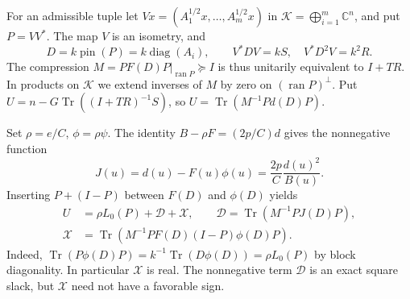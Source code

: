 \documentclass[11pt]{article}
\newcommand{\Tr}{\operatorname{Tr}}
\newcommand{\ran}{\operatorname{ran}}
\newcommand{\pin}{\operatorname{pin}}
\begin{document}
For an admissible tuple let
\(Vx=(A_1^{1/2}x,\ldots,A_m^{1/2}x)\) in
\(\mathcal K=\bigoplus_{i=1}^m\mathbb C^n\), and put \(P=VV^*\).
The map \(V\) is an isometry, and
\[
D=k\pin(P)=k\operatorname{diag}(A_i),\qquad
V^*DV=kS,\quad V^*D^2V=k^2R.
\]
The compression \(M=PF(D)P|_{\ran P}\succeq I\) is thus
unitarily equivalent to \(I+TR\). In products on \(\mathcal K\)
we extend inverses of \(M\) by zero on \((\ran P)^\perp\).
Put \(U=n-G\Tr((I+TR)^{-1}S)\), so
\(U=\Tr(M^{-1}P d(D)P)\).

Set \(\rho=e/C\), \(\phi=\rho\psi\).
The identity \(B-\rho F=(2p/C)d\) gives the nonnegative function
\begin{equation}\label{eq:J}
J(u)=d(u)-F(u)\phi(u)=\frac{2p}{C}\frac{d(u)^2}{B(u)}.
\end{equation}
Inserting \(P+(I-P)\) between \(F(D)\) and \(\phi(D)\) yields
\begin{equation}\label{eq:split}
\begin{split}
U&=\rho L_0(P)+\mathcal D+\mathcal X,\qquad
 \mathcal D=\Tr(M^{-1}P J(D)P),\\
\mathcal X&=\Tr(M^{-1}P F(D)(I-P)\phi(D)P).
\end{split}
\end{equation}
Indeed, \(\Tr(P\phi(D)P)=k^{-1}\Tr(D\phi(D))=\rho L_0(P)\)
by block diagonality. In particular \(\mathcal X\) is real.
The nonnegative term \(\mathcal D\) is an exact square slack, but
\(\mathcal X\) need not have a favorable sign.
\end{document}
